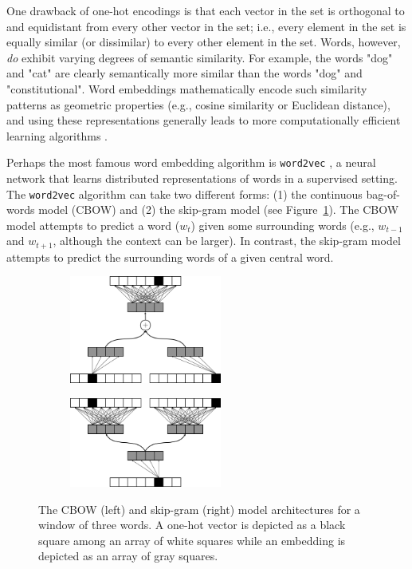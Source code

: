\documentclass{article}
\begin{document}
One drawback of one-hot encodings is that each vector in the set is orthogonal to and equidistant from every other vector in the set; i.e., every element in the set is equally similar (or dissimilar) to every other element in the set. Words, however, \emph{do} exhibit varying degrees of semantic similarity. For example, the words "dog" and "cat" are clearly semantically more similar than the words "dog" and "constitutional". Word embeddings mathematically encode such similarity patterns as geometric properties (e.g., cosine similarity or Euclidean distance), and using these representations generally leads to more computationally efficient learning algorithms \parencite{Bengio2003}.

Perhaps the most famous word embedding algorithm is \texttt{word2vec} \parencite{Mikolov2013}, a neural network that learns distributed representations of words in a supervised setting. The \texttt{word2vec} algorithm can take two different forms: (1) the continuous bag-of-words model (CBOW) and (2) the skip-gram model (see Figure~\ref{fig:word2vec}). The CBOW model attempts to predict a word ($w_t$) given some surrounding words (e.g., $w_{t-1}$ and $w_{t+1}$, although the context can be larger). In contrast, the skip-gram model attempts to predict the surrounding words of a given central word.

\begin{figure}[h]
\captionsetup[subfigure]{labelformat=empty}
\centering

    \begin{subfigure}[t]{0.45\textwidth}
    \centering
    \includegraphics[width=5cm]{cbow_fig.png}
    \caption{}
    \end{subfigure}%
    \begin{subfigure}[t]{0.45\textwidth}
    \centering
    \includegraphics[width=5cm]{skip_gram.png}
    \caption{}
    \end{subfigure}

\caption{The CBOW (left) and skip-gram (right) model architectures for a window of three words. A one-hot vector is depicted as a black square among an array of white squares while an embedding is depicted as an array of gray squares.}
\label{fig:word2vec}
\end{figure}
\end{document}
